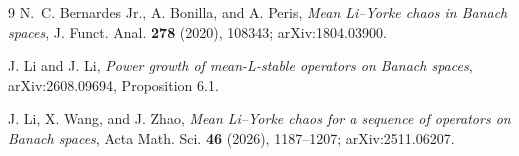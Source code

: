 \documentclass[11pt]{article}
\begin{document}
\begin{thebibliography}{9}
N.~C. Bernardes Jr., A. Bonilla, and A. Peris,
\emph{Mean Li--Yorke chaos in Banach spaces},
J. Funct. Anal. \textbf{278} (2020), 108343;
arXiv:1804.03900.

J. Li and J. Li,
\emph{Power growth of mean-L-stable operators on Banach spaces},
arXiv:2608.09694, Proposition 6.1.

J. Li, X. Wang, and J. Zhao,
\emph{Mean Li--Yorke chaos for a sequence of operators on Banach spaces},
Acta Math. Sci. \textbf{46} (2026), 1187--1207;
arXiv:2511.06207.
\end{thebibliography}
\end{document}
